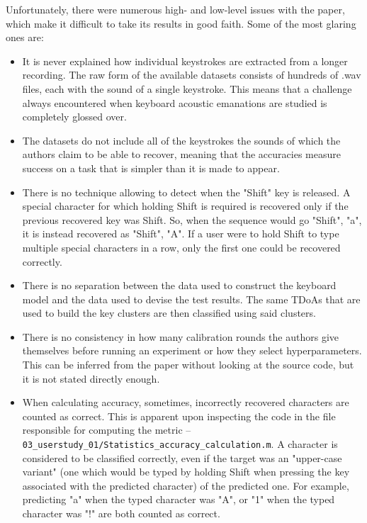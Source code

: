 \documentclass[../main.tex]{subfiles}
\begin{document}
Unfortunately, there were numerous high- and low-level issues with the paper, which make it difficult to take its results in good faith. Some of the most glaring ones are:
\begin{itemize}
    \item It is never explained how individual keystrokes are extracted from a longer recording.
    The raw form of the available datasets consists of hundreds of .wav files, each with the sound of a single keystroke.
    This means that a challenge always encountered when keyboard acoustic emanations are studied is completely glossed over.
    \item The datasets do not include all of the keystrokes the sounds of which the authors claim to be able to recover, meaning that the accuracies measure success on a task that is simpler than it is made to appear.
    \item There is no technique allowing to detect when the "Shift" key is released. A special character for which holding Shift is required is recovered only if the previous recovered key was Shift. So, when the sequence would go "Shift", "a", it is instead recovered as "Shift", "A". If a user were to hold Shift to type multiple special characters in a row,
    only the first one could be recovered correctly.
    \item There is no separation between the data used to construct the keyboard model and the
    data used to devise the test results. The same TDoAs that are used to build the key clusters
    are then classified using said clusters.
    \item There is no consistency in how many calibration rounds the authors give themselves before running an experiment or how they select hyperparameters. This can be inferred from the paper without looking at the source code, but it is not stated directly enough.
    \item When calculating accuracy, sometimes, incorrectly recovered characters are counted as
    correct. This is apparent upon inspecting the code in the file responsible for computing the metric -- 
    \verb|03_userstudy_01/Statistics_accuracy_calculation.m|. A character is considered to be classified correctly, even if the target was an "upper-case variant" (one which would be typed by holding Shift when pressing the key associated with the predicted character) of the predicted one.
    For example, predicting "a" when the typed character was "A", or "1" when the typed character was "!" are both counted as correct.
\end{itemize}
\end{document}
